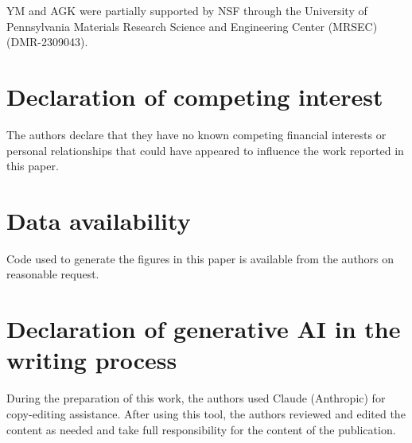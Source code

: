 \documentclass[final, 11pt, nonatbib]{elsarticle}
\theoremstyle{definition}
\theoremstyle{plain}
\numberwithin{equation}{section}
\begin{document}
YM and AGK were partially supported by NSF through the University of Pennsylvania Materials Research Science and Engineering Center (MRSEC) (DMR-2309043).

\section*{Declaration of competing interest}

The authors declare that they have no known competing financial interests or personal relationships that could have appeared to influence the work reported in this paper.

\section*{Data availability}

Code used to generate the figures in this paper is available from the authors on reasonable request.

\section*{Declaration of generative AI in the writing process}

During the preparation of this work, the authors used Claude (Anthropic) for copy-editing assistance. After using this tool, the authors reviewed and edited the content as needed and take full responsibility for the content of the publication.

\printbibliography
\end{document}
